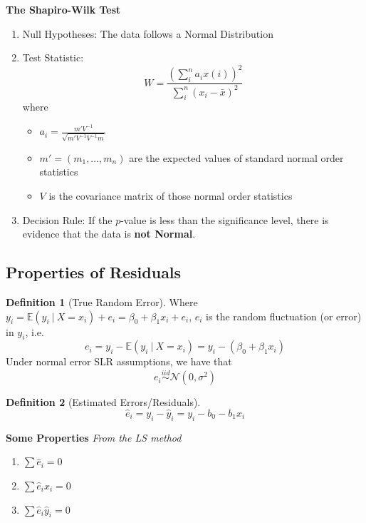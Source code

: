 \documentclass[11pt]{article}
\theoremstyle{definition}
\newtheorem{definition}{Definition}[section]
\numberwithin{equation}{section}
\begin{document}
\textbf{The Shapiro-Wilk Test}
  \begin{enumerate}
    \item Null Hypotheses: The data follows a Normal Distribution
    \item Test Statistic: 
    \begin{equation*}
      W = \frac{(\sum_i^n a_ix(i))^2}{\sum^n_i (x_i - \bar{x})^2}
    \end{equation*}
    where
    \begin{itemize}
      \item $a_i = \frac{m'V^{-1}}{\sqrt{m'V^{-1}V^{-1}m}}$
      \item $m' = (m_1,\dots,m_n)$ are the expected values of standard normal order statistics
      \item $V$ is the covariance matrix of those normal order statistics
    \end{itemize}
    \item Decision Rule: If the $p$-value is less than the significance level, there is evidence that the data is \textbf{not Normal}.
  \end{enumerate}
\subsection{Properties of Residuals}
\begin{definition}[True Random Error]
Where $y_i = \mathbb{E}(y_i\>|\>X=x_i) + e_i = \beta_0+\beta_1x_i+e_i$, $e_i$ is the random fluctuation (or error) in $y_i$, i.e. 
\begin{equation}
  e_i = y_i - \mathbb{E}(y_i\>|\> X = x_i) = y_i - (\beta_0+\beta_1x_i)
\end{equation}
Under normal error SLR assumptions, we have that
\begin{equation}
  e_i\stackrel{iid}{\sim}\mathcal{N}(0,\sigma^2)
\end{equation}
\end{definition}

\begin{definition}[Estimated Errors/Residuals]
  \begin{equation}
    \hat{e}_i=y_i-\hat{y}_i=y_i-b_0-b_1x_i
  \end{equation}
\end{definition}

\textbf{Some Properties}
\textit{From the LS method}
\begin{enumerate}
  \item $\sum \hat{e}_i=0$
  \item $\sum \hat{e}_ix_i = 0$
  \item $\sum \hat{e}_i\hat{y}_i=0$
\end{enumerate}
\end{document}
